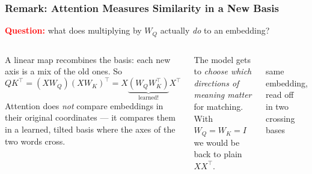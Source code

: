 \begin{frame}
    \frametitle{Remark: Attention Measures Similarity in a New Basis}

    \textcolor{red}{\textbf{Question:}} what does multiplying by $W_Q$ actually \emph{do} to an embedding?

    \pause

    \begin{columns}[T,onlytextwidth]
            A linear map \alert{recombines the basis}: each new axis is a mix of the old ones. So
            \[
                Q K^\top = (X W_Q)(X W_K)^\top = X \underbrace{\left(W_Q W_K^\top\right)}_{\text{learned!}} X^\top
            \]
            Attention does \emph{not} compare embeddings in their original coordinates --- it compares them in a \alert{learned, tilted basis} where the axes of the two words \alert{cross}.

            \vspace{2mm}
            \pause

            The model gets to \emph{choose which directions of meaning matter} for matching. With $W_Q = W_K = I$ we would be back to plain $XX^\top$.
            \begin{center}
            \\[1mm]
            {\scriptsize same embedding, read off \\ in two \alert{crossing} bases}
            \end{center}
    \end{columns}
\end{frame}

